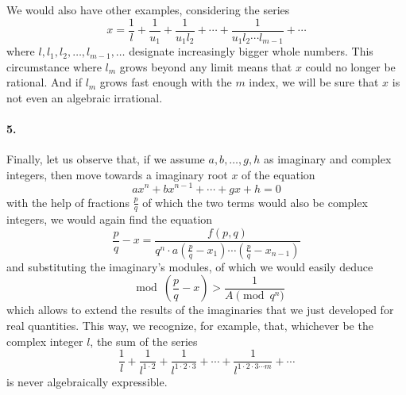 \documentclass{article}
\begin{document}
We would also have other examples, considering the series
$$x = \frac{1}{l} + \frac{1}{u_1} + \frac{1}{u_1 l_2} + \cdots
	+ \frac{1}{u_1 l_2 \cdots l_{m-1}} + \cdots$$
where $l, l_1, l_2, \ldots, l_{m-1}, \ldots$ designate increasingly bigger whole
numbers. This circumstance where $l_m$ grows beyond any limit means that $x$
could no longer be rational. And if $l_m$ grows fast enough with the $m$ index,
we will be sure that $x$ is not even an algebraic irrational.

\paragraph{5.}
Finally, let us observe that, if we assume $a, b, \ldots, g, h$ as imaginary
and complex integers, then move towards a imaginary root $x$ of the equation
$$ax^n + bx^{n-1} + \cdots + gx + h = 0$$
with the help of fractions $\frac{p}{q}$ of which the two terms would also be
complex integers, we would again find the equation
$$\frac{p}{q} - x = \frac{f(p,q)}{q^n\cdot a\left(\frac{p}{q}
		- x_1\right)\cdots\left(\frac{p}{q}-x_{n-1}\right)}$$
and substituting the imaginary’s modules, of which we would easily deduce
$$\mod\left(\frac{p}{q}- x\right) > \frac{1}{A\pmod{q}^n}$$
which allows to extend the results of the imaginaries that we just developed for
real quantities. This way, we recognize, for example, that, whichever be the
complex integer $l$, the sum of the series
$$\frac{1}{l} + \frac{1}{l^{1 \cdot 2}} + \frac{1}{l^{1\cdot 2\cdot 3}}
	+ \cdots + \frac{1}{l^{1\cdot 2\cdot 3\cdots m}} + \cdots$$
is never algebraically expressible.
\end{document}
